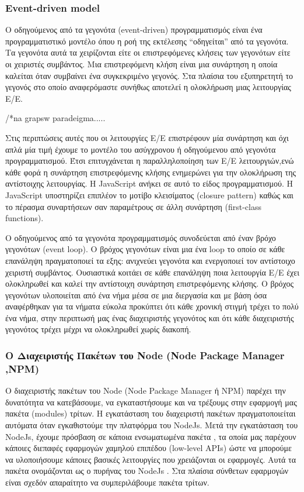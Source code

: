 \subsubsection{Event-driven model}		 

		O οδηγούμενος από τα γεγονότα (event-driven) προγραμματισμός είναι ένα προγραμματιστικό μοντέλο όπου η ροή της εκτέλεσης “οδηγείται” από τα γεγονότα. Τα γεγονότα αυτά τα χειρίζονται είτε οι επιστρεφόμενες κλήσεις των γεγονότων είτε οι χειριστές συμβάντος. Μια επιστρεφόμενη κλήση είναι μια συνάρτηση η οποία καλείται όταν συμβαίνει ένα συγκεκριμένο γεγονός. Στα πλαίσια του εξυπηρετητή το γεγονός στο οποίο αναφερόμαστε συνήθως αποτελεί η ολοκλήρωση μιας λειτουργίας Ε/Ε. 
		

		/*na grapsw paradeigma.....
		
		Στις περιπτώσεις αυτές που οι λειτουργίες Ε/Ε επιστρέφουν μία συνάρτηση και όχι απλά μία τιμή έχουμε το μοντέλο του ασύγχρονου ή οδηγούμενου από γεγονότα προγραμματισμού. Έτσι επιτυγχάνεται η παραλληλοποίηση των Ε/Ε λειτουργιών,ενώ κάθε φορά η συνάρτηση επιστρεφόμενης κλήσης ενημερώνει για την ολοκλήρωση της αντίστοιχης λειτουργίας. Η JavaScript ανήκει σε αυτό το είδος προγραμματισμού. Η JavaScript υποστηρίζει επιπλέον το μοτίβο κλεισίματος (closure pattern) καθώς και το πέρασμα συναρτήσεων σαν παραμέτρους σε άλλη συνάρτηση (first-class functions).
		

		Ο οδηγούμενος από τα γεγονότα προγραμματισμός συνοδεύεται από έναν βρόχο γεγονότων (event loop). Ο βρόχος γεγονότων είναι μια ένα loop το οποίο σε κάθε επανάληψη πραγματοποιεί τα εξης: ανιχνεύει γεγονότα και ενεργοποιεί τον αντίστοιχο χειριστή συμβάντος. Ουσιαστικά κοιτάει σε κάθε επανάληψη ποια λειτουργία Ε/Ε έχει ολοκληρωθεί και καλεί την αντίστοιχη συνάρτηση επιστρεφόμενης κλήσης. Ο βρόχος γεγονότων υλοποιείται από ένα νήμα μέσα σε μια διεργασία και με βάση όσα αναφέρθηκαν για τα νήματα εύκολα προκύπτει ότι κάθε χρονική στιγμή τρέχει το πολύ ένα νήμα, στην περιπτωσή μας ένας διαχειριστής γεγονότος και ότι κάθε διαχειριστής γεγονότος τρέχει μέχρι να ολοκληρωθεί χωρίς διακοπή.
		
		\subsubsection{Ο Διαχειριστής Πακέτων του Node (Node Package Manager ,NPM)}
		

		Ο διαχειριστής πακέτων του Node (Node Package Manager ή NPM) παρέχει την δυνατότητα να κατεβάσουμε, να εγκαταστήσουμε και να τρέξουμς στην εφαρμογή μας πακέτα (modules) τρίτων. H εγκατάσταση του διαχειριστή  πακέτων πραγματοποιείται  αυτόματα όταν εγκαθιστούμε την πλατφόρμα του NodeJs. Μετά την εγκατάσταση του NodeJs, έχουμε πρόσβαση σε κάποια ενσωματωμένα πακέτα , τα οποία μας παρέχουν κάποιες διεπαφές εφαρμογών χαμηλού επιπέδου (low-level APIs) ώστε να μπορούμε να υλοποιήσουμε κάποιες βασικές λειτουργίες που χρειάζονται οι εφαρμογές. Αυτά τα πακέτα ονομάζονται ως ο πυρήνας του NodeJs . Στα πλαίσια σύνθετων εφαρμογών είναι σχεδόν απαραίτητο να συμπεριλάβουμε πακέτα τρίτων.


